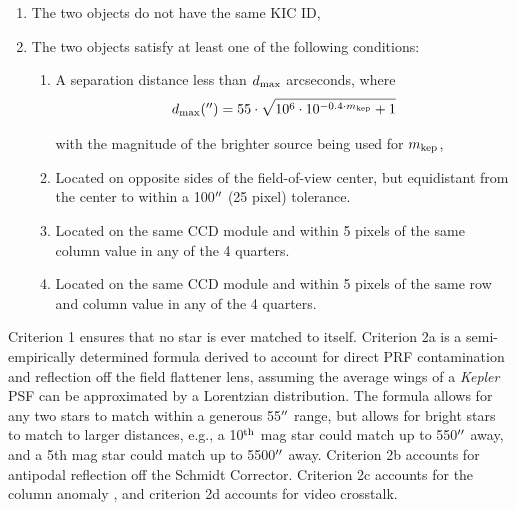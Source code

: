\begin{enumerate}

\item The two objects do not have the same KIC ID,

\item The two objects satisfy at least one of the following conditions: 

    \begin{enumerate}
    
    \item A separation distance less than $d_{\rm max}$ arcseconds, where
    \begin{equation}
    \label{disteq}
    d_{\rm max}(\arcsec) = 55\cdot\sqrt{10^{6}\cdot 10^{-0.4 \cdot m_{\rm kep}}+1}
    \end{equation}

\noindent with the \kepler{} magnitude of the brighter source being used for $m_{\rm kep}$,  

    \item Located on opposite sides of the field-of-view center, but equidistant from the center to within a 100$\mbox{$^{\prime\prime}$}$ (25 pixel) tolerance.
    
    \item Located on the same CCD module and within 5 pixels of the same column value in any of the 4 quarters.
    
    \item Located on the same CCD module and within 5 pixels of the same row and column value in any of the 4 quarters.

   \end{enumerate}

\end{enumerate}


\noindent Criterion 1 ensures that no star is ever matched to itself. Criterion 2a is a semi-empirically determined formula derived to account for direct PRF contamination and reflection off the field flattener lens, assuming the average wings of a \emph{Kepler} PSF can be approximated by a Lorentzian distribution. The formula allows for any two stars to match within a generous 55$\mbox{$^{\prime\prime}$}$ range, but allows for bright stars to match to larger distances, e.g., a 10$^{\rm th}$ mag star could match up to 550$\mbox{$^{\prime\prime}$}$ away, and a 5th mag star could match up to 5500$\mbox{$^{\prime\prime}$}$ away. Criterion 2b accounts for antipodal reflection off the Schmidt Corrector. Criterion 2c accounts for the column anomaly \citep[see \S3.5 of][]{Coughlin2016}, and criterion 2d accounts for video crosstalk.


